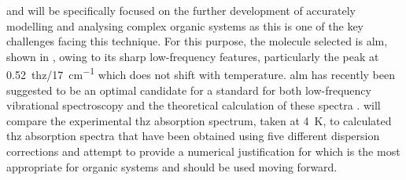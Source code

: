  and  will be specifically focused on the further development of accurately modelling and analysing complex organic systems as this is one of the key challenges facing this technique. For this purpose, the molecule selected is \acrfull{alm}, shown in , owing to its sharp low-frequency features, particularly the peak at \SI{0.52}{\acrshort{thz}}/\SI{17}{cm^{-1}} which does not shift with temperature. \acrshort{alm} has recently been suggested to be an optimal candidate for a standard for both low\nobreakdash-frequency vibrational spectroscopy and the theoretical calculation of these spectra \cite{Dampf2020}.  will compare the experimental \acrshort{thz} absorption spectrum, taken at \SI{4}{K}, to calculated \acrshort{thz} absorption spectra that have been obtained using five different dispersion corrections and attempt to provide a numerical justification for which is the most appropriate for organic systems and should be used moving forward.

